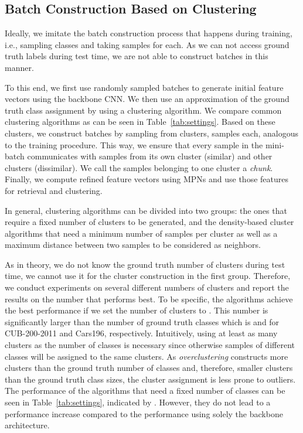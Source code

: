 \documentclass{article}
\begin{document}
\subsection{Batch Construction Based on Clustering}
\label{subsec:test_batches}
Ideally, we imitate the batch construction process that happens during training, i.e., sampling  classes and taking  samples for each. As we can not access ground truth labels during test time, we are not able to construct batches in this manner.

To this end, we first use randomly sampled batches to generate initial feature vectors using the backbone CNN. We then use an approximation of the ground truth class assignment by using a clustering algorithm. We compare  common clustering algorithms as can be seen in Table~\ref{tab:settings}. 
Based on these clusters, we construct batches by sampling from  clusters,  samples each, analogous to the training procedure. This way, we ensure that every sample in the mini-batch communicates with samples from its own cluster (similar) and other clusters (dissimilar). We call the  samples belonging to one cluster a {\it chunk}.
Finally, we compute refined feature vectors using MPNs and use those features for retrieval and clustering.

In general, clustering algorithms can be divided into two groups: the ones that require a fixed number of clusters to be generated, and the density-based cluster algorithms that need a minimum number of samples per cluster as well as a maximum distance  between two samples to be considered as neighbors.

As in theory, we do not know the ground truth number of clusters during test time, we cannot use it for the cluster construction in the first group. Therefore, we conduct experiments on several different numbers of clusters and report the results on the number that performs best. To be specific, the algorithms achieve the best performance if we set the number of clusters to . This number is significantly larger than the number of ground truth classes which is  and  for CUB-200-2011 and Cars196, respectively. 
Intuitively, using at least as many clusters as the number of classes is necessary since otherwise samples of different classes will be assigned to the same clusters. As \textit{overclustering} constructs more clusters than the ground truth number of classes and, therefore, smaller clusters than the ground truth class sizes, the cluster assignment is less prone to outliers. 
The performance of the algorithms that need a fixed number of classes can be seen in Table~\ref{tab:settings}, indicated by . However, they do not lead to a performance increase compared to the performance using solely the backbone architecture.
\end{document}
